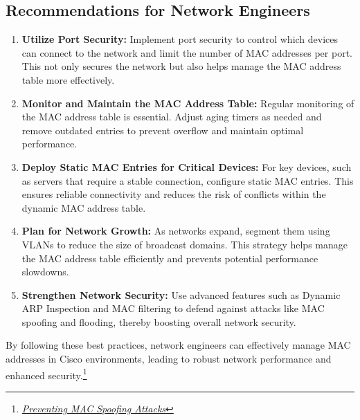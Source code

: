 \documentclass[11pt,a4paper]{article}
\begin{document}
    \subsection*{Recommendations for Network Engineers}
    \begin{enumerate}
        \item \textbf{Utilize Port Security:} Implement port security to control which devices can connect to the network and limit the number of MAC addresses per port. This not only secures the network but also helps manage the MAC address table more effectively.
        \item \textbf{Monitor and Maintain the MAC Address Table:} Regular monitoring of the MAC address table is essential. Adjust aging timers as needed and remove outdated entries to prevent overflow and maintain optimal performance.
        \item \textbf{Deploy Static MAC Entries for Critical Devices:} For key devices, such as servers that require a stable connection, configure static MAC entries. This ensures reliable connectivity and reduces the risk of conflicts within the dynamic MAC address table.
        \item \textbf{Plan for Network Growth:} As networks expand, segment them using VLANs to reduce the size of broadcast domains. This strategy helps manage the MAC address table efficiently and prevents potential performance slowdowns.
        \item \textbf{Strengthen Network Security:} Use advanced features such as Dynamic ARP Inspection and MAC filtering to defend against attacks like MAC spoofing and flooding, thereby boosting overall network security.
    \end{enumerate}

By following these best practices, network engineers can effectively manage MAC addresses in Cisco environments, leading to robust network performance and enhanced security.\footnote{\href{https://www.cisco.com/c/en/us/td/docs/switches/lan/catalyst6500/ios/12-2SX/best/practices/recommendations.html}{\textit{Preventing MAC Spoofing Attacks}}}




\end{document}
